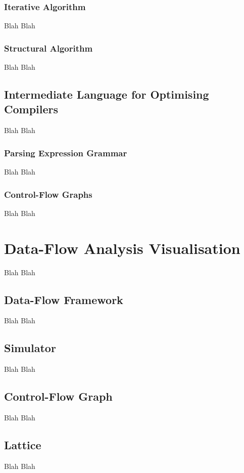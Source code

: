 \documentclass[bsc,twoside,singlespacing,parskip,logo,notimes,normalheadings]{infthesis}
\begin{document}
	\subsection{Iterative Algorithm}
	Blah Blah
    
    	\subsection{Structural Algorithm}
	Blah Blah
        
	\section{Intermediate Language for Optimising Compilers}
	Blah Blah
    
    	\subsection{Parsing Expression Grammar}
	Blah Blah
    
    	\subsection{Control-Flow Graphs}
        Blah Blah


\chapter{Data-Flow Analysis Visualisation}
Blah Blah

    \section{Data-Flow Framework}
    Blah Blah
    
    \section{Simulator}
    Blah Blah
    
    \section{Control-Flow Graph}
    Blah Blah
    
    \section{Lattice}
    Blah Blah
    

\end{document}
